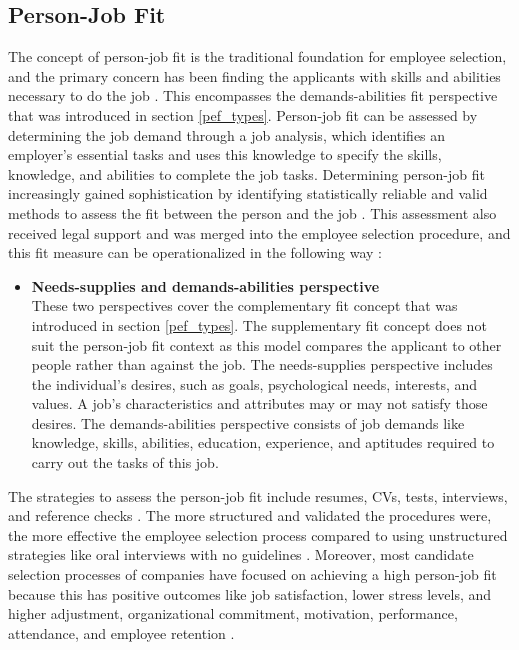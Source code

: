 \documentclass[draft,final]{thesisclass} %
\begin{document}
\subsection{Person-Job Fit}
The concept of person-job fit is the traditional foundation for employee selection, and the primary concern has been finding the applicants with skills and abilities necessary to do the job \parencite[183]{po_and_pj_fit_literature_review}.
This encompasses the demands-abilities fit perspective that was introduced in section \ref{pef_types}.
Person-job fit can be assessed by determining the job demand through a job analysis, which identifies an employer's essential tasks and uses this knowledge to specify the skills, knowledge, and abilities to complete the job tasks.
Determining person-job fit increasingly gained sophistication by identifying statistically reliable and valid methods to assess the fit between the person and the job \parencite[183]{po_and_pj_fit_literature_review}.
This assessment also received legal support and was merged into the employee selection procedure, and this fit measure can be operationalized in the following way \parencite[183-184]{po_and_pj_fit_literature_review}:
\begin{itemize}
    \item \textbf{Needs-supplies and demands-abilities perspective}\\
    These two perspectives cover the complementary fit concept that was introduced in section \ref{pef_types}.
    The supplementary fit concept does not suit the person-job fit context as this model compares the applicant to other people rather than against the job.
    The needs-supplies perspective includes the individual's desires, such as goals, psychological needs, interests, and values. A job's characteristics and attributes may or may not satisfy those desires.
    The demands-abilities perspective consists of job demands like knowledge, skills, abilities, education, experience, and aptitudes required to carry out the tasks of this job.
\end{itemize}
The strategies to assess the person-job fit include resumes, \acs{CV}s, tests, interviews, and reference checks \parencite[184]{po_and_pj_fit_literature_review}.
The more structured and validated the procedures were, the more effective the employee selection process compared to using unstructured strategies like oral interviews with no guidelines \parencite[184]{po_and_pj_fit_literature_review}.
Moreover, most candidate selection processes of companies have focused on achieving a high person-job fit because this has positive outcomes like job satisfaction, lower stress levels, and higher adjustment, organizational commitment, motivation, performance, attendance, and employee retention \parencite[184]{po_and_pj_fit_literature_review}.
\end{document}
